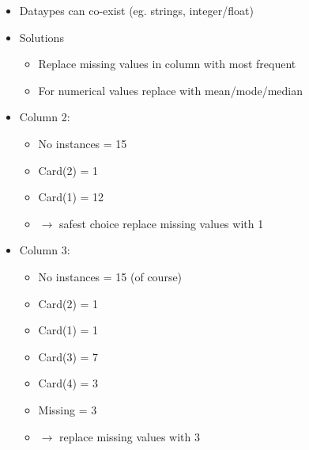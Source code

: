 \begin{frame}[allowframebreaks]
\begin{itemize}
\item Dataypes can co-exist (eg. strings, integer/float)
\vfill
\item Solutions
\begin{itemize}
\item Replace missing values in column with most frequent
\item For numerical values replace with mean/mode/median
\end{itemize}
\item Column 2:
\begin{itemize}
\item No instances = 15
\item Card(2) = 1
\item Card(1) = 12
\item $\rightarrow$ safest choice replace missing values with 1 
\end{itemize}
\item Column 3:
\begin{itemize}
\item No instances = 15 (of course)
\item Card(2) = 1 
\item Card(1) = 1
\item Card(3) = 7
\item Card(4) = 3
\item Missing = 3
\item $\rightarrow$ replace missing values with 3
\end{itemize}
\end{itemize}
\end{frame}


